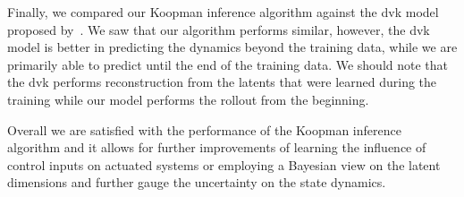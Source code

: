 Finally, we compared our Koopman inference algorithm against the \acl{dvk} model proposed by~\cite{mortonDeepVariationalKoopman2019a}. We saw that our algorithm performs similar, however, the \ac{dvk} model is better in predicting the dynamics beyond the training data, while we are primarily able to predict until the end of the training data. We should note that the \ac{dvk} performs reconstruction from the latents that were learned during the training while our model performs the rollout from the beginning.

Overall we are satisfied with the performance of the Koopman inference algorithm and it allows for further improvements of learning the influence of control inputs on actuated systems or employing a Bayesian view on the latent dimensions and further gauge the uncertainty on the state dynamics.
